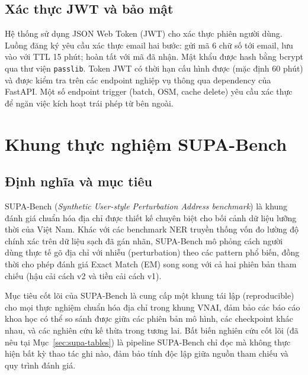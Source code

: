 \subsection{Xác thực JWT và bảo mật}
\label{sec:jwt}

Hệ thống sử dụng JSON Web Token (JWT) cho xác thực phiên người dùng. Luồng đăng ký yêu cầu xác thực email hai bước:  gửi mã 6 chữ số tới email, lưu vào  với TTL 15 phút;  hoàn tất với mã đã nhận. Mật khẩu được hash bằng bcrypt qua thư viện \texttt{passlib}. Token JWT có thời hạn cấu hình được (mặc định 60 phút) và được kiểm tra trên các endpoint nghiệp vụ thông qua dependency  của FastAPI. Một số endpoint trigger (batch, OSM, cache delete) yêu cầu xác thực để ngăn việc kích hoạt trái phép từ bên ngoài.

\section{Khung thực nghiệm SUPA-Bench}
\label{sec:supa}

\subsection{Định nghĩa và mục tiêu}
\label{sec:supa-definition}

SUPA-Bench (\textit{Synthetic User-style Perturbation Address benchmark}) là khung đánh giá chuẩn hóa địa chỉ được thiết kế chuyên biệt cho bối cảnh dữ liệu lưỡng thời của Việt Nam. Khác với các benchmark NER truyền thống vốn đo lường độ chính xác trên dữ liệu sạch đã gán nhãn, SUPA-Bench mô phỏng cách người dùng thực tế gõ địa chỉ với nhiễu (perturbation) theo các pattern phổ biến, đồng thời cho phép đánh giá Exact Match (EM) song song với cả hai phiên bản tham chiếu (hậu cải cách v2 và tiền cải cách v1).

Mục tiêu cốt lõi của SUPA-Bench là cung cấp một khung tái lập (reproducible) cho mọi thực nghiệm chuẩn hóa địa chỉ trong khung VNAI, đảm bảo các báo cáo khoa học có thể so sánh được giữa các phiên bản mô hình, các checkpoint khác nhau, và các nghiên cứu kế thừa trong tương lai. Bất biến nghiên cứu cốt lõi (đã nêu tại Mục~\ref{sec:supa-tables}) là pipeline SUPA-Bench chỉ đọc  mà không thực hiện bất kỳ thao tác ghi nào, đảm bảo tính độc lập giữa nguồn tham chiếu và quy trình đánh giá.

